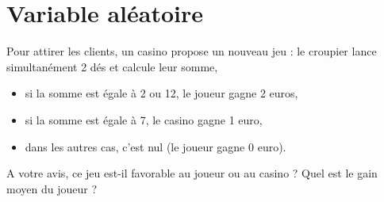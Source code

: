 \documentclass{book}
\begin{document}
\section{Variable aléatoire}
\begin{Exemple}[Jeu]Pour attirer les clients, un casino propose un nouveau jeu : le croupier lance simultanément 2 dés et calcule leur somme,
\begin{itemize} 
\item si la somme est égale à 2 ou 12, le joueur gagne 2 euros,
\item si la somme est égale à 7, le casino gagne 1 euro,
\item dans les autres cas, c'est nul (le joueur gagne 0 euro).  
\end{itemize}
A votre avis, ce jeu est-il favorable au joueur ou au casino ? Quel est le gain moyen du joueur ?



\end{Exemple}
\end{document}
